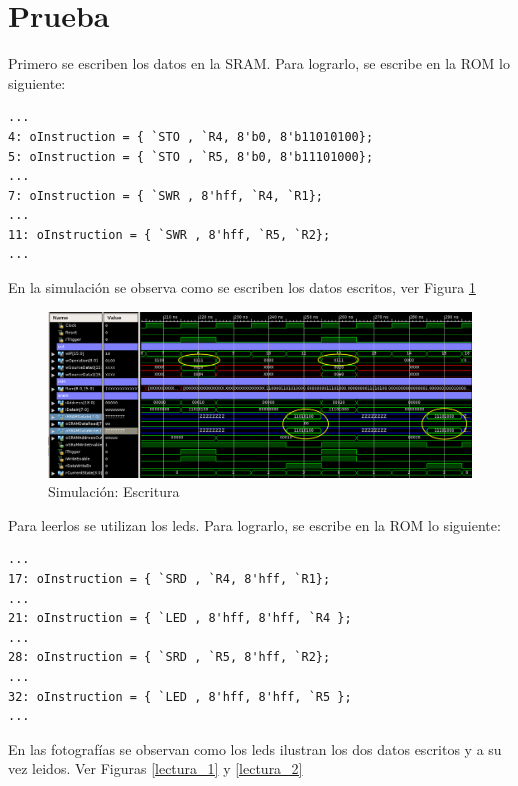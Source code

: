 \documentclass[10pt]{article}
\begin{document}
\section{Prueba}
Primero se escriben los datos en la SRAM. Para lograrlo, se escribe en la ROM lo siguiente:

\begin{lstlisting}
...
4: oInstruction = { `STO , `R4, 8'b0, 8'b11010100};
5: oInstruction = { `STO , `R5, 8'b0, 8'b11101000};
...
7: oInstruction = { `SWR , 8'hff, `R4, `R1};
...
11: oInstruction = { `SWR , 8'hff, `R5, `R2};
...
\end{lstlisting}

En la simulación se observa como se escriben los datos escritos, ver Figura \ref{sim_escritura}

\begin{figure}[hbtp]
\centering
\includegraphics[width=1\textwidth]{escritura.png}
\caption{Simulación: Escritura}
\label{sim_escritura}
\end{figure}

\newpage

Para leerlos se utilizan los leds. Para lograrlo, se escribe en la ROM lo siguiente:

\begin{lstlisting}
...
17: oInstruction = { `SRD , `R4, 8'hff, `R1};
...
21: oInstruction = { `LED , 8'hff, 8'hff, `R4 };
...
28: oInstruction = { `SRD , `R5, 8'hff, `R2};
...
32: oInstruction = { `LED , 8'hff, 8'hff, `R5 };
...
\end{lstlisting}

En las fotografías se observan como los leds ilustran los dos datos escritos y a su vez leidos. Ver Figuras \ref{lectura_1} y \ref{lectura_2}
\end{document}
